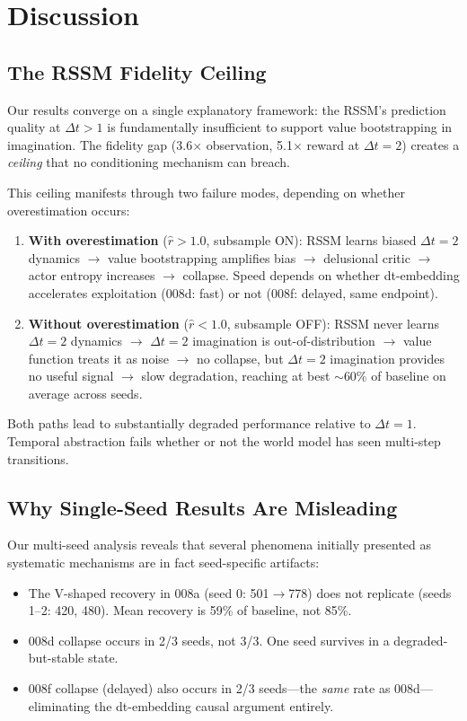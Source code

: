 \documentclass[10pt,letterpaper]{article}
\newcommand{\dt}{\Delta t}
\begin{document}
\section{Discussion}\label{sec:discussion}

\subsection{The RSSM Fidelity Ceiling}

Our results converge on a single explanatory framework: the RSSM's prediction quality at $\dt>1$ is fundamentally insufficient to support value bootstrapping in imagination.
The fidelity gap (3.6$\times$ observation, 5.1$\times$ reward at $\dt=2$) creates a \emph{ceiling} that no conditioning mechanism can breach.

This ceiling manifests through two failure modes, depending on whether overestimation occurs:
\begin{enumerate}[nosep]
  \item \textbf{With overestimation} ($\hat{r} > 1.0$, subsample ON): RSSM learns biased $\dt=2$ dynamics $\to$ value bootstrapping amplifies bias $\to$ delusional critic $\to$ actor entropy increases $\to$ collapse.
    Speed depends on whether dt-embedding accelerates exploitation (008d: fast) or not (008f: delayed, same endpoint).
  \item \textbf{Without overestimation} ($\hat{r} < 1.0$, subsample OFF): RSSM never learns $\dt=2$ dynamics $\to$ $\dt=2$ imagination is out-of-distribution $\to$ value function treats it as noise $\to$ no collapse, but $\dt=2$ imagination provides no useful signal $\to$ slow degradation, reaching at best $\sim$60\% of baseline on average across seeds.
\end{enumerate}

Both paths lead to substantially degraded performance relative to $\dt=1$.
Temporal abstraction fails whether or not the world model has seen multi-step transitions.

\subsection{Why Single-Seed Results Are Misleading}

Our multi-seed analysis reveals that several phenomena initially presented as systematic mechanisms are in fact seed-specific artifacts:
\begin{itemize}[nosep]
  \item The V-shaped recovery in 008a (seed 0: 501$\to$778) does not replicate (seeds 1--2: 420, 480). Mean recovery is 59\% of baseline, not 85\%.
  \item 008d collapse occurs in 2/3 seeds, not 3/3. One seed survives in a degraded-but-stable state.
  \item 008f collapse (delayed) also occurs in 2/3 seeds---the \emph{same} rate as 008d---eliminating the dt-embedding causal argument entirely.
\end{itemize}
\end{document}
